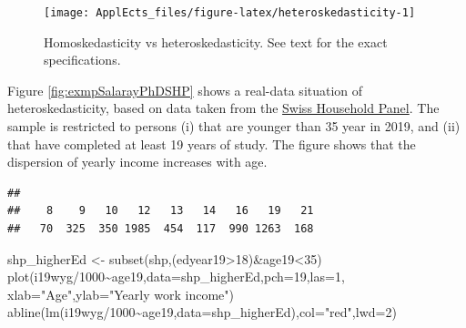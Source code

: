 \documentclass[
  12pt,
]{book}
\newenvironment{Shaded}{\begin{snugshade}}{\end{snugshade}}
\newcommand{\AttributeTok}[1]{\textcolor[rgb]{0.77,0.63,0.00}{#1}}
\newcommand{\DecValTok}[1]{\textcolor[rgb]{0.00,0.00,0.81}{#1}}
\newcommand{\FunctionTok}[1]{\textcolor[rgb]{0.00,0.00,0.00}{#1}}
\newcommand{\NormalTok}[1]{#1}
\newcommand{\OtherTok}[1]{\textcolor[rgb]{0.56,0.35,0.01}{#1}}
\newcommand{\SpecialCharTok}[1]{\textcolor[rgb]{0.00,0.00,0.00}{#1}}
\newcommand{\StringTok}[1]{\textcolor[rgb]{0.31,0.60,0.02}{#1}}
\theoremstyle{definition}
\theoremstyle{definition}
\theoremstyle{definition}
\theoremstyle{definition}
\theoremstyle{remark}
\begin{document}
\begin{figure}
\texttt{[image: ApplEcts\_files/figure-latex/heteroskedasticity-1]} \caption{Homoskedasticity vs heteroskedasticity. See text for the exact specifications.}\label{fig:heteroskedasticity}
\end{figure}

Figure \ref{fig:exmpSalarayPhDSHP} shows a real-data situation of heteroskedasticity, based on data taken from the \href{https://forscenter.ch/projects/swiss-household-panel/}{Swiss Household Panel}. The sample is restricted to persons (i) that are younger than 35 year in 2019, and (ii) that have completed at least 19 years of study. The figure shows that the dispersion of yearly income increases with age.

\begin{Shaded}
\end{Shaded}

\begin{verbatim}
## 
##    8    9   10   12   13   14   16   19   21 
##   70  325  350 1985  454  117  990 1263  168
\end{verbatim}

\begin{Shaded}
\begin{Highlighting}[]
\NormalTok{shp\_higherEd }\OtherTok{\textless{}{-}} \FunctionTok{subset}\NormalTok{(shp,(edyear19}\SpecialCharTok{\textgreater{}}\DecValTok{18}\NormalTok{)}\SpecialCharTok{\&}\NormalTok{age19}\SpecialCharTok{\textless{}}\DecValTok{35}\NormalTok{)}
\FunctionTok{plot}\NormalTok{(i19wyg}\SpecialCharTok{/}\DecValTok{1000}\SpecialCharTok{\textasciitilde{}}\NormalTok{age19,}\AttributeTok{data=}\NormalTok{shp\_higherEd,}\AttributeTok{pch=}\DecValTok{19}\NormalTok{,}\AttributeTok{las=}\DecValTok{1}\NormalTok{,}
     \AttributeTok{xlab=}\StringTok{"Age"}\NormalTok{,}\AttributeTok{ylab=}\StringTok{"Yearly work income"}\NormalTok{)}
\FunctionTok{abline}\NormalTok{(}\FunctionTok{lm}\NormalTok{(i19wyg}\SpecialCharTok{/}\DecValTok{1000}\SpecialCharTok{\textasciitilde{}}\NormalTok{age19,}\AttributeTok{data=}\NormalTok{shp\_higherEd),}\AttributeTok{col=}\StringTok{"red"}\NormalTok{,}\AttributeTok{lwd=}\DecValTok{2}\NormalTok{)}
\end{Highlighting}
\end{Shaded}
\end{document}
